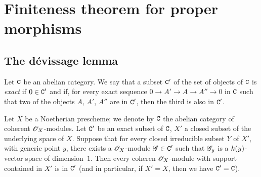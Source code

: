 \section{Finiteness theorem for proper morphisms}
\label{section:finiteness-theorem-for-proper-morphisms}

\subsection{The d\'evissage lemma}
\label{subsection:devissage-lemma}

\begin{defn}[3.1.1]
\label{3.3.1.1}
Let $\mathtt{C}$ be an abelian category.
We say that a subset $\mathtt{C}'$ of the set of objects of $\mathtt{C}$ is \emph{exact} if $0\in\mathtt{C}'$ and if, for every exact sequence $0\to A'\to A\to A''\to 0$ in $\mathtt{C}$ such that two of the objects $A$, $A'$, $A''$ are in $\mathtt{C}'$, then the third is also in $\mathtt{C}'$.
\end{defn}

\begin{thm}[3.1.2]
\label{3.3.1.2}
Let $X$ be a Noetherian prescheme; we denote by $\mathtt{C}$ the abelian category of coherent $\mathscr{O}_X$-modules.
Let $\mathtt{C}'$ be an exact subset of $\mathtt{C}$, $X'$ a closed subset of the underlying space of $X$.
Suppose that for every closed irreducible subset $Y$ of $X'$, with generic point $y$, there exists a $\mathscr{O}_X$-module $\mathscr{G}\in\mathtt{C}'$ such that $\mathscr{G}_y$ is a $k(y)$-vector space of dimension~$1$.
Then every coheren $\mathscr{O}_X$-module with support contained in $X'$ is in $\mathtt{C}'$ (and in particular, if $X'=X$, then we have $\mathtt{C}'=\mathtt{C}$).
\end{thm}

